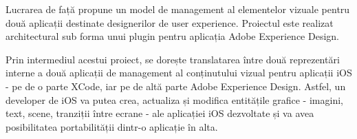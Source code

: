 
\par Lucrarea de față propune un model de management al elementelor vizuale pentru două aplicații destinate designerilor de user experience. Proiectul  este realizat architectural sub forma unui plugin pentru aplicația Adobe Experience Design. 
\par Prin intermediul acestui proiect, se dorește translatarea între două reprezentări interne a două aplicații de management al conținutului vizual pentru aplicații iOS - pe de o parte XCode, iar pe de altă parte Adobe Experience Design. Astfel, un developer de iOS va putea crea, actualiza și modifica entitățile grafice - imagini, text, scene, tranziții între ecrane - ale aplicației iOS dezvoltate și va avea posibilitatea portabilității dintr-o aplicație în alta.


